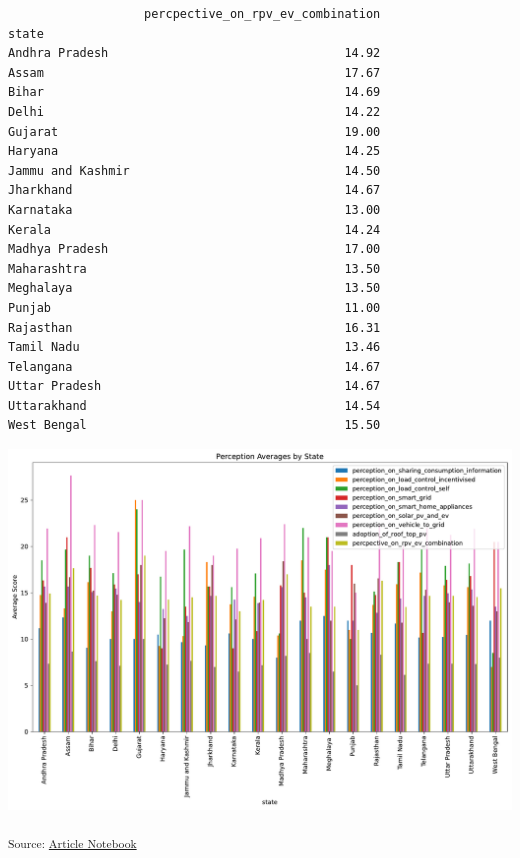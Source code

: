 \documentclass[
  letterpaper,
  DIV=11,
  numbers=noendperiod]{scrartcl}
\begin{document}
\begin{verbatim}
                   percpective_on_rpv_ev_combination  
state                                                 
Andhra Pradesh                                 14.92  
Assam                                          17.67  
Bihar                                          14.69  
Delhi                                          14.22  
Gujarat                                        19.00  
Haryana                                        14.25  
Jammu and Kashmir                              14.50  
Jharkhand                                      14.67  
Karnataka                                      13.00  
Kerala                                         14.24  
Madhya Pradesh                                 17.00  
Maharashtra                                    13.50  
Meghalaya                                      13.50  
Punjab                                         11.00  
Rajasthan                                      16.31  
Tamil Nadu                                     13.46  
Telangana                                      14.67  
Uttar Pradesh                                  14.67  
Uttarakhand                                    14.54  
West Bengal                                    15.50  
\end{verbatim}

\includegraphics{index_files/figure-pdf/cell-8-output-2.pdf}

\textsubscript{Source:
\href{https://sijuswamyresearch.github.io/SM-project/index-preview.html}{Article
Notebook}}
\end{document}
